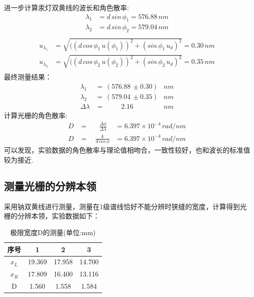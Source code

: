 \documentclass[12pt]{article}
\begin{document}
\quad 进一步计算汞灯双黄线的波长和角色散率:
\begin{equation*}
\begin{aligned}
 \lambda_1&=d\,sin\,\phi_1=576.88\,nm \\
 \lambda_2&=d\,sin\,\phi_2=579.04\,nm \\
\end{aligned}
\end{equation*}
\begin{equation*}
\begin{aligned}
 u_{\lambda_1}&=\sqrt{((d\,cos\,\phi_1\,u(\phi_1))^2+(sin\,\phi_1\,u_d)^2}=0.30\,nm \\
 u_{\lambda_2}&=\sqrt{((d\,cos\,\phi_2\,u(\phi_2))^2+(sin\,\phi_2\,u_d)^2}=0.35\,nm \\
\end{aligned}
\end{equation*}
\quad 最终测量结果：
\begin{equation}
    \begin{aligned}
        \lambda_1 &=\, (576.88\, \pm 0.30)&nm \\
        \lambda_2 &=\, (579.04\, \pm 0.35)&nm \\
        \Delta \lambda&=\,\quad \quad \;2.16&nm
    \end{aligned}
\end{equation}
\quad 计算光栅的角色散率:
\begin{equation}
\begin{aligned}
 D&=\quad \;\; \frac{\Delta \phi}{\Delta \lambda}&=6.397\times 10^{-4}\,rad/nm \\
 D&=\quad \frac{k}{d\,cos\,\phi}&=6.397\times 10^{-4}\,rad/nm 
\end{aligned}
\end{equation}
\quad 可以发现，实验数据的角色散率与理论值相吻合，一致性较好，也和波长的标准值较为接近.

\subsection{测量光栅的分辨本领}
\vspace{0.2cm}
\quad 采用钠双黄线进行测量，测量在1级谱线恰好不能分辨时狭缝的宽度，计算得到光栅的分辨本领，实验数据如下：\\
\begin{table}[h]
    \centering
    \begin{tabular}{cccc}
    序号    & 1      & 2      & 3      \\ \hline
    $x_L$ & 19.369 & 17.958 & 14.700 \\
    $x_R$ & 17.809 & 16.400 & 13.116 \\
    D     & 1.560  & 1.558  & 1.584 
    \end{tabular}
    \caption{极限宽度D的测量(单位:mm)}
\end{table}
\end{document}
